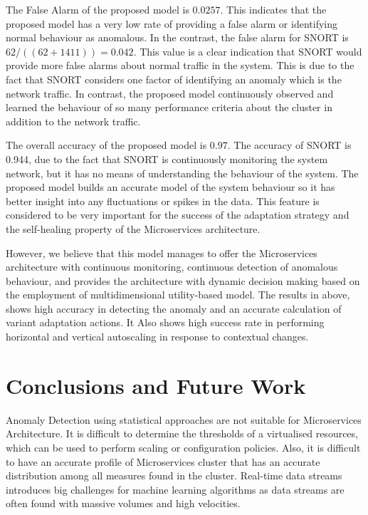 \documentclass[graybox]{svmult}
\begin{document}
The False Alarm of the proposed model  is $0.0257$. This indicates that the proposed model has a very low rate of providing a false alarm or identifying normal behaviour as anomalous. In the contrast, the false alarm for SNORT is $62/((62+1411))=0.042$. This value is a clear indication that SNORT would provide more false alarms about normal traffic in the system. This is due to the fact that SNORT considers one factor of identifying an anomaly which is the network traffic. In contrast, the proposed model continuously observed and learned the behaviour of so many performance criteria about the cluster in addition to the network traffic. 




The overall accuracy of the proposed model is $0.97$. The accuracy of SNORT is 0.944, due to the fact that SNORT is continuously monitoring the system network, but it has no means of understanding the behaviour of the system. The proposed model builds an accurate model of the system behaviour so it has better insight into any fluctuations or spikes in the data. This feature is considered to be very important for the success of the adaptation strategy and the self-healing property of the Microservices architecture. 

However, we believe that this model manages to offer the Microservices architecture with continuous monitoring, continuous detection of anomalous behaviour, and provides the architecture with dynamic decision making based on the employment of multidimensional utility-based model. The results in above, shows high accuracy in detecting the anomaly and an accurate calculation of variant adaptation actions. It Also shows high success rate in performing horizontal and vertical autoscaling in response to contextual changes. 


 \section{Conclusions and Future Work}\label{sec:Conclusion}
 Anomaly Detection using statistical approaches are not suitable for Microservices Architecture. It is difficult to determine the thresholds of a virtualised resources, which can be used to perform scaling or configuration policies. 
Also, it is difficult to have an accurate profile of Microservices cluster that has an accurate distribution among all measures found in the cluster. Real-time data streams introduces big challenges for machine learning algorithms as data streams are often found with massive volumes and high velocities. 
\end{document}
